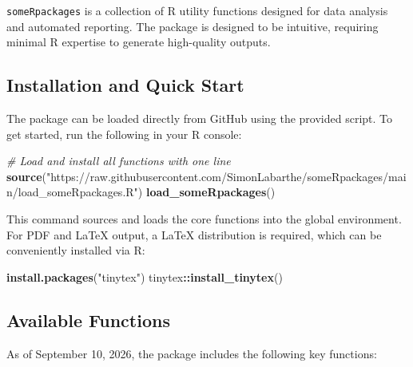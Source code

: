 \documentclass[
]{article}
\newenvironment{Shaded}{\begin{snugshade}}{\end{snugshade}}
\newcommand{\CommentTok}[1]{\textcolor[rgb]{0.56,0.35,0.01}{\textit{#1}}}
\newcommand{\FunctionTok}[1]{\textcolor[rgb]{0.13,0.29,0.53}{\textbf{#1}}}
\newcommand{\NormalTok}[1]{#1}
\newcommand{\SpecialCharTok}[1]{\textcolor[rgb]{0.81,0.36,0.00}{\textbf{#1}}}
\newcommand{\StringTok}[1]{\textcolor[rgb]{0.31,0.60,0.02}{#1}}
\begin{document}
\texttt{someRpackages} is a collection of R utility functions designed
for data analysis and automated reporting. The package is designed to be
intuitive, requiring minimal R expertise to generate high-quality
outputs.

\subsection{Installation and Quick
Start}\label{installation-and-quick-start}

The package can be loaded directly from GitHub using the provided
script. To get started, run the following in your R console:

\begin{Shaded}
\begin{Highlighting}[]
\CommentTok{\# Load and install all functions with one line}
\FunctionTok{source}\NormalTok{(}\StringTok{"https://raw.githubusercontent.com/SimonLabarthe/someRpackages/main/load\_someRpackages.R"}\NormalTok{)}
\FunctionTok{load\_someRpackages}\NormalTok{()}
\end{Highlighting}
\end{Shaded}

This command sources and loads the core functions into the global
environment. For PDF and LaTeX output, a LaTeX distribution is required,
which can be conveniently installed via R:

\begin{Shaded}
\begin{Highlighting}[]
\FunctionTok{install.packages}\NormalTok{(}\StringTok{"tinytex"}\NormalTok{)}
\NormalTok{tinytex}\SpecialCharTok{::}\FunctionTok{install\_tinytex}\NormalTok{()}
\end{Highlighting}
\end{Shaded}

\subsection{Available Functions}\label{available-functions}

As of September 10, 2026, the package includes the following key
functions:
\end{document}
